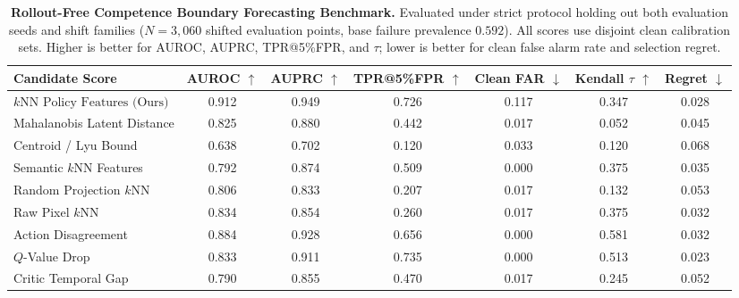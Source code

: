 \begin{table}[t]
\centering
\small
\caption{\textbf{Rollout-Free Competence Boundary Forecasting Benchmark.} Evaluated under strict protocol holding out both evaluation seeds and shift families ($N = 3,060$ shifted evaluation points, base failure prevalence $0.592$). All scores use disjoint clean calibration sets. Higher is better for AUROC, AUPRC, TPR@5\%FPR, and $\tau$; lower is better for clean false alarm rate and selection regret.}
\label{tab:predictor_benchmarks}
\begin{tabular}{lcccccc}
\toprule
\textbf{Candidate Score} & \textbf{AUROC $\uparrow$} & \textbf{AUPRC $\uparrow$} & \textbf{TPR@5\%FPR $\uparrow$} & \textbf{Clean FAR $\downarrow$} & \textbf{Kendall $\tau$ $\uparrow$} & \textbf{Regret $\downarrow$} \\
\midrule
$k\text{NN Policy Features (Ours)}$ & 0.912 & 0.949 & 0.726 & 0.117 & 0.347 & 0.028 \\
Mahalanobis Latent Distance & 0.825 & 0.880 & 0.442 & 0.017 & 0.052 & 0.045 \\
Centroid / Lyu Bound & 0.638 & 0.702 & 0.120 & 0.033 & 0.120 & 0.068 \\
Semantic $k\text{NN}$ Features & 0.792 & 0.874 & 0.509 & 0.000 & 0.375 & 0.035 \\
Random Projection $k\text{NN}$ & 0.806 & 0.833 & 0.207 & 0.017 & 0.132 & 0.053 \\
Raw Pixel $k\text{NN}$ & 0.834 & 0.854 & 0.260 & 0.017 & 0.375 & 0.032 \\
Action Disagreement & 0.884 & 0.928 & 0.656 & 0.000 & 0.581 & 0.032 \\
$Q$-Value Drop & 0.833 & 0.911 & 0.735 & 0.000 & 0.513 & 0.023 \\
Critic Temporal Gap & 0.790 & 0.855 & 0.470 & 0.017 & 0.245 & 0.052 \\
\bottomrule
\end{tabular}
\end{table}
